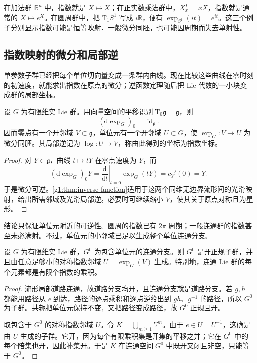 在加法群 \(\mathbb R^n\) 中，指数就是 \(X\mapsto X\)；在正实数乘法群中，\(X^L_x=xX\)，指数就是通常的 \(X\mapsto e^X\)。在圆周群中，把 \(\mathrm{T}_1S^1\) 写成 \(i\mathbb R\)，便有 \(\exp_{S^1}(it)=e^{it}\)。这三个例子分别显示指数可能是恒等映射、一般微分同胚，也可能因周期而失去单射性。

\subsection{指数映射的微分和局部逆}
\label{g1:subsec:1602:02}

单参数子群已经把每个单位切向量变成一条群内曲线。现在比较这些曲线在零时刻的初速度，就能求出指数在原点的微分；逆函数定理随后把 Lie 代数的一小块变成群的局部坐标。

\begin{proposition}\label{g1:prop:exponential-local-diffeomorphism}
	设 \(G\) 为有限维实 Lie 群。用向量空间的平移识别 \(\mathrm{T}_0\mathfrak g=\mathfrak g\)，则
	\[
		(\mathrm{d}\exp_G)_0=\operatorname{id}_{\mathfrak g}.
	\]
	因而零点有一个开邻域 \(V\subset\mathfrak g\)，单位元有一个开邻域 \(U\subset G\)，使 \(\exp_G:V\to U\) 为微分同胚。其局部逆记为 \(\log:U\to V\)，称由此得到的坐标为指数坐标。
\end{proposition}
\begin{proof}
	对 \(Y\in\mathfrak g\)，曲线 \(t\mapsto tY\) 在零点速度为 \(Y\)，而
	\[
		(\mathrm{d}\exp_G)_0Y
		=\left.\frac{\mathrm{d}}{\mathrm{d}t}\right|_{t=0}\exp_G(tY)
		=c_Y'(0)=Y.
	\]
	于是微分可逆。\cref{g1:thm:inverse-function}适用于这两个同维无边界流形间的光滑映射，给出所需邻域及光滑局部逆。必要时可继续缩小 \(V\)，使其关于原点对称且为星形。
\end{proof}

结论只保证单位元附近的可逆性。圆周的指数已有 \(2\pi\) 周期；一般连通群的指数甚至未必满射。不过，单位元的小邻域已足以生成整个单位连通分支。

\begin{proposition}\label{g1:prop:exponentials-generate-identity-component}
	设 \(G\) 为有限维实 Lie 群，\(G^0\) 为包含单位元的连通分支。则 \(G^0\) 是开正规子群，并且由任意足够小的对称指数邻域 \(U=\exp_G(V)\) 生成。特别地，连通 Lie 群的每个元素都是有限个指数的乘积。
\end{proposition}
\begin{proof}
	流形局部道路连通，故道路分支均开，且连通分支就是道路分支。若 \(g,h\) 都能用路径从 \(e\) 到达，路径的逐点乘积和逐点逆给出到 \(gh\)、\(g^{-1}\) 的路径，所以 \(G^0\) 为子群。共轭把单位元保持不变，又把路径变成路径，故 \(G^0\) 正规且开。

	取包含于 \(G^0\) 的对称指数邻域 \(U\)。令 \(K=\bigcup_{m\ge1}U^m\)。由于 \(e\in U=U^{-1}\)，这确是由 \(U\) 生成的子群。它开，因为每个有限乘积集是开集的平移之并；它在 \(G^0\) 中的每个陪集也开，因此补集开。于是 \(K\) 在连通空间 \(G^0\) 中既开又闭且非空，只能等于 \(G^0\)。
\end{proof}

